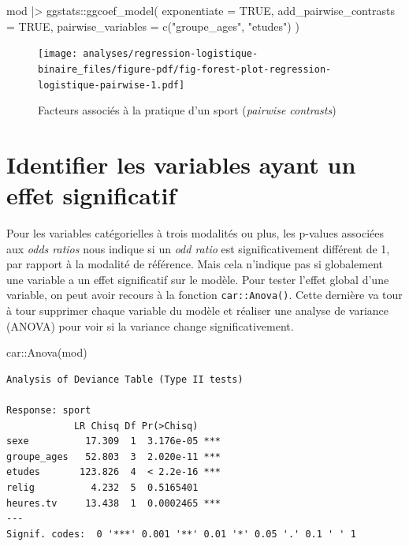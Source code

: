 \documentclass[
  letterpaper,
  DIV=11,
  numbers=noendperiod,
  oneside]{scrreprt}
\newenvironment{Shaded}{\begin{snugshade}}{\end{snugshade}}
\newcommand{\AttributeTok}[1]{\textcolor[rgb]{0.40,0.45,0.13}{#1}}
\newcommand{\ConstantTok}[1]{\textcolor[rgb]{0.56,0.35,0.01}{#1}}
\newcommand{\FunctionTok}[1]{\textcolor[rgb]{0.28,0.35,0.67}{#1}}
\newcommand{\NormalTok}[1]{\textcolor[rgb]{0.00,0.23,0.31}{#1}}
\newcommand{\SpecialCharTok}[1]{\textcolor[rgb]{0.37,0.37,0.37}{#1}}
\newcommand{\StringTok}[1]{\textcolor[rgb]{0.13,0.47,0.30}{#1}}
\begin{document}
\begin{Shaded}
\begin{Highlighting}[]
\NormalTok{mod }\SpecialCharTok{|\textgreater{}} 
\NormalTok{  ggstats}\SpecialCharTok{::}\FunctionTok{ggcoef\_model}\NormalTok{(}
    \AttributeTok{exponentiate =} \ConstantTok{TRUE}\NormalTok{,}
    \AttributeTok{add\_pairwise\_contrasts =} \ConstantTok{TRUE}\NormalTok{,}
    \AttributeTok{pairwise\_variables =} \FunctionTok{c}\NormalTok{(}\StringTok{"groupe\_ages"}\NormalTok{, }\StringTok{"etudes"}\NormalTok{)}
\NormalTok{  )}
\end{Highlighting}
\end{Shaded}

\begin{figure}[H]

{\centering \texttt{[image: analyses/regression-logistique-binaire\_files/figure-pdf/fig-forest-plot-regression-logistique-pairwise-1.pdf]}

}

\caption{\label{fig-forest-plot-regression-logistique-pairwise}Facteurs
associés à la pratique d'un sport (\emph{pairwise contrasts})}

\end{figure}

\hypertarget{sec-reg-log-anova}{%
\section{Identifier les variables ayant un effet
significatif}\label{sec-reg-log-anova}}

Pour les variables catégorielles à trois modalités ou plus, les p-values
associées aux \emph{odds ratios} nous indique si un \emph{odd ratio} est
significativement différent de 1, par rapport à la modalité de
référence. Mais cela n'indique pas si globalement une variable a un
effet significatif sur le modèle. Pour tester l'effet global d'une
variable, on peut avoir recours à la fonction \texttt{car::Anova()}.
Cette dernière va tour à tour supprimer chaque variable du modèle et
réaliser une analyse de variance (ANOVA) pour voir si la variance change
significativement.

\begin{Shaded}
\begin{Highlighting}[]
\NormalTok{car}\SpecialCharTok{::}\FunctionTok{Anova}\NormalTok{(mod)}
\end{Highlighting}
\end{Shaded}

\begin{verbatim}
Analysis of Deviance Table (Type II tests)

Response: sport
            LR Chisq Df Pr(>Chisq)    
sexe          17.309  1  3.176e-05 ***
groupe_ages   52.803  3  2.020e-11 ***
etudes       123.826  4  < 2.2e-16 ***
relig          4.232  5  0.5165401    
heures.tv     13.438  1  0.0002465 ***
---
Signif. codes:  0 '***' 0.001 '**' 0.01 '*' 0.05 '.' 0.1 ' ' 1
\end{verbatim}
\end{document}
